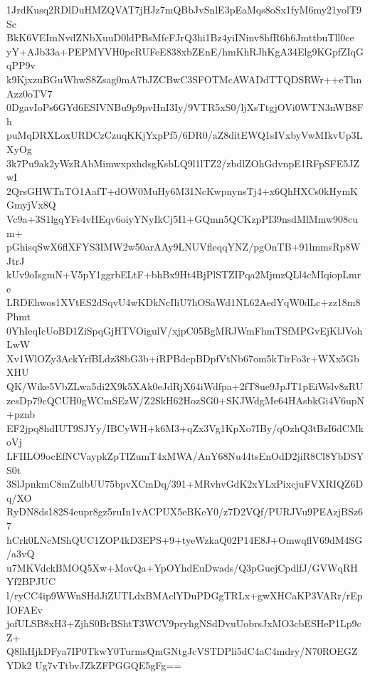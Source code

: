 1JrdKusq2RDlDuHMZQVAT7jHJz7mQBbJvSnlE3pEaMqs8oSx1fyM6my21yolT9Sc
BkK6VEImNvdZNbXuuD0ldPBsMfcFJrQ3hi1Bz4yiINinv8hfR6h6JmttbuTll0ce
yY+AJb33a+PEPMYVH0peRUFeE838xbZEnE/hmKhRJhKgA34Elg9KGpfZIqGqPP9v
k9KjxzuBGuWhwS8Zsag0mA7bJZCBwC3SFOTMcAWADdTTQDSRWr++eThnAzz0oTV7
0DgavIoPs6GYd6ESIVNBu9p9pvHnI3Iy/9VTR5xS0/ljXsTtgjOVi0WTN3nWB8Fh
puMqDRXLoxURDCzCzuqKKjYxpPf5/6DR0/aZ8ditEWQ1sIVxbyVwMIkvUp3LXyOg
3k7Pu9ak2yWzRAbMimwxpxhdsgKsbLQ9l1lTZ2/zbdlZOhGdvnpE1RFpSFE5JZwI
2QrsGHWTnTO1AafT+dOW0MuHy6M31NcKwpnynsTj4+x6QhHXCs0kHymKGmyjVx8Q
Vc9a+3S1lgqYFs4vHEqv6oiyYNyIkCj5I1+GQmn5QCKzpPI39nsdMlMmw908cum+
pGhisqSwX6flXFYS3IMW2w50arAAy9LNUVfleqqYNZ/pgOnTB+91lmmsRp8WJtrJ
kUv9oIsgmN+V5pY1ggrbELtF+bhBx9Ht4BjPlSTZIPqa2MjmzQLl4cMIqiopLmre
LRDEhwos1XVtES2dSqvU4wKDkNcIliU7hOSaWd1NL62AedYqW0dLc+zz18m8Phmt
0YhIeqIcUoBD1ZiSpqGjHTVOigulV/xjpC05BgMRJWmFhmTSfMPGvEjKlJVohLwW
Xv1WlOZy3AckYrfBLdz38bG3b+iRPBdepBDpfVtNb67om5kTirFo3r+WXx5GbXHU
QK/Wike5VbZLwa5di2X9k5XAk0eJdRjX64iWdfpa+2fT8ue9JpJT1pEiWslv8zRU
zesDp79cQCUH0gWCmSEzW/Z2SkH62HozSG0+SKJWdgMe64HAsbkGi4V6upN+pznb
EF2jpq8hdIUT9SJYy/IBCyWH+k6M3+qZx3Vg1KpXo7IBy/qOzhQ3tBzI6dCMkoVj
LFIILO9ocEfNCVaypkZpTIZumT4xMWA/AnY68Nu44tsEnOdD2jiR8Cl8YbDSYS0t
3SlJpnkmC8mZulbUU75bpvXCmDq/391+MRvhvGdK2xYLxPixcjuFVXRIQZ6Dq/XO
RyDN8ds182S4eupr8gz5ruIn1vACPUX5eBKeY0/z7D2VQf/PURJVu9PEAzjBSz67
hCrk0LNcMShQUC1ZOP4kD3EPS+9+tyeWzkaQ02P14E8J+OmwqflV69dM4SG/a3vQ
u7MKVdckBMOQ5Xw+MovQa+YpOYhdEuDwads/Q3pGuejCpdlfJ/GVWqRHYf2BPJUC
l/ryCC4ip9WWnSHdJiZUTLdxBMAclYDuPDGgTRLx+gwXHCaKP3VARr/rEpIOFAEv
jofULSB8xH3+ZjhS0BrBShtT3WCV9pryhgNSdDvuUobrsJxMO3cbESHeP1Lp9cZ+
Q8lhHjkDFya7IP0TkwY0TurmsQmGNtgJcVSTDPli5dC4aC4mdry/N70ROEGZYDk2
Ug7vTtbvJZkZFPGGQE5gFg==
